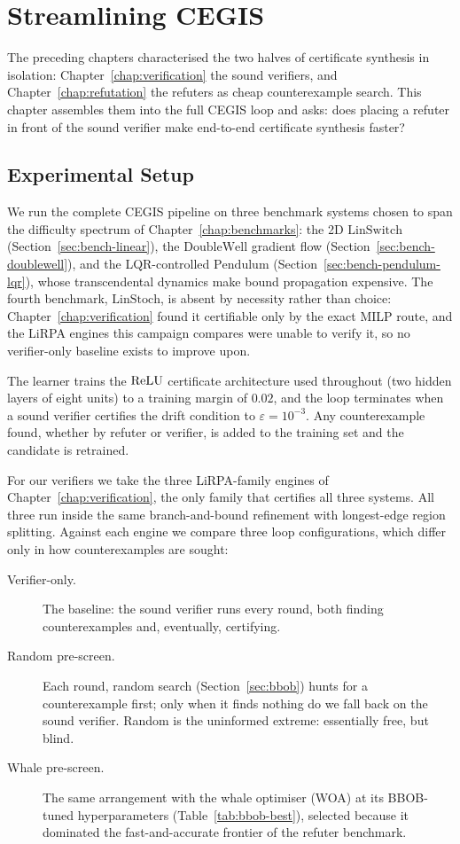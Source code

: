 \chapter{Streamlining CEGIS}
\label{chap:streamlining}

The preceding chapters characterised the two halves of certificate synthesis in
isolation: Chapter~\ref{chap:verification} the sound verifiers, and
Chapter~\ref{chap:refutation} the refuters as cheap counterexample search. This
chapter assembles them into the full CEGIS loop and asks: does placing a refuter in front of the sound verifier make
end-to-end certificate synthesis faster?

\section{Experimental Setup}

We run the complete CEGIS pipeline on three benchmark systems chosen to span
the difficulty spectrum of Chapter~\ref{chap:benchmarks}: the 2D $\mathrm{LinSwitch}$ (Section~\ref{sec:bench-linear}), the $\mathrm{DoubleWell}$ gradient
flow (Section~\ref{sec:bench-doublewell}), and
the LQR-controlled $\mathrm{Pendulum}$ (Section~\ref{sec:bench-pendulum-lqr}),
whose transcendental dynamics make bound propagation expensive. The fourth
benchmark, $\mathrm{LinStoch}$, is absent by necessity rather than choice:
Chapter~\ref{chap:verification} found it certifiable only by the exact MILP
route, and the LiRPA engines this campaign compares were unable to verify it,
so no verifier-only baseline exists to improve upon.

The learner trains the $\mathrm{ReLU}$ certificate architecture used throughout (two
hidden layers of eight units) to a training margin of $0.02$, and the loop
terminates when a sound verifier certifies the drift condition to
$\varepsilon = 10^{-3}$. Any counterexample found, whether by refuter or
verifier, is added to the training set and the candidate is retrained.

For our verifiers we take the three LiRPA-family engines of
Chapter~\ref{chap:verification}, the only family that certifies all three
systems. All three run inside the same branch-and-bound refinement with longest-edge region splitting. Against each engine we compare three loop configurations, which differ only in
how counterexamples are sought:

\begin{description}
\item[Verifier-only.] The baseline: the sound verifier runs every round, both
  finding counterexamples and, eventually, certifying.
\item[Random pre-screen.] Each round, random search
  (Section~\ref{sec:bbob}) hunts for a counterexample first; only when it
  finds nothing do we fall back on the sound verifier. Random is the
  uninformed extreme: essentially free, but blind.
\item[Whale pre-screen.] The same arrangement with the whale optimiser (WOA)
  at its BBOB-tuned hyperparameters (Table~\ref{tab:bbob-best}), selected because it dominated the fast-and-accurate
  frontier of the refuter benchmark.
\end{description}

